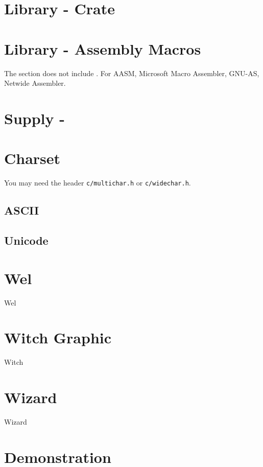 \section{Library \mbox{-}  Crate}

\section{Library \mbox{-} Assembly Macros}

The section does not include . For AASM, Microsoft Macro Assembler, GNU-AS, Netwide Assembler.

\section{Supply \mbox{-} }

\section{Charset}

You may need the header \verb|c/multichar.h| or \verb|c/widechar.h|.

\subsection{ASCII}

\subsection{Unicode}





\section{Wel}
{Wel}

\section{Witch Graphic}
{Witch}

\section{Wizard}
{Wizard}

\section{Demonstration}

